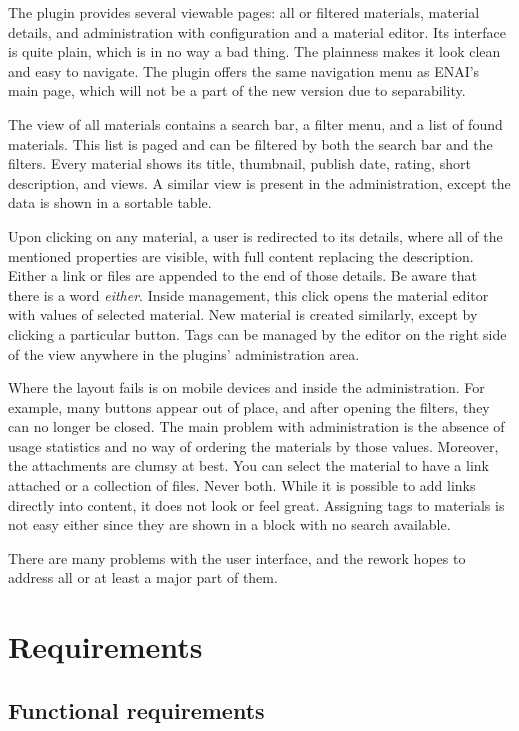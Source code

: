 \documentclass[
  digital,     %
  oneside,     %
  nosansbold,  %
  colorbold, %
  lof,         %
  lot,         %
]{fithesis4}
\begin{document}
The plugin provides several viewable pages: all or filtered materials, material details, and administration with configuration and a material editor. Its interface is quite plain, which is in no way a bad thing. The plainness makes it look clean and easy to navigate. The plugin offers the same navigation menu as ENAI's main page, which will not be a part of the new version due to separability.

The view of all materials contains a search bar, a filter menu, and a list of found materials. This list is paged and can be filtered by both the search bar and the filters. Every material shows its title, thumbnail, publish date, rating, short description, and views. A similar view is present in the administration, except the data is shown in a sortable table.

Upon clicking on any material, a user is redirected to its details, where all of the mentioned properties are visible, with full content replacing the description. Either a link or files are appended to the end of those details.
Be aware that there is a word \textit{either}. Inside management, this click opens the material editor with values of selected material. New material is created similarly, except by clicking a particular button. Tags can be managed by the editor on the right side of the view anywhere in the plugins' administration area.

Where the layout fails is on mobile devices and inside the administration. For example, many buttons appear out of place, and after opening the filters, they can no longer be closed. The main problem with administration is the absence of usage statistics and no way of ordering the materials by those values. Moreover, the attachments are clumsy at best. You can select the material to have a link attached or a collection of files. Never both. While it is possible to add links directly into content, it does not look or feel great. Assigning tags to materials is not easy either since they are shown in a block with no search available.

There are many problems with the user interface, and the rework hopes to address all or at least a major part of them.

\section{Requirements}

\subsection{Functional requirements}
\end{document}
